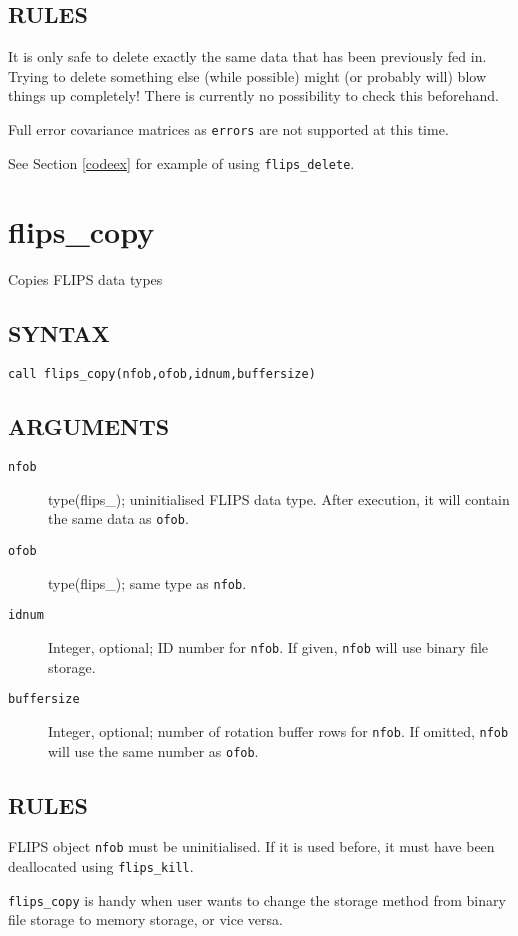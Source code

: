 \documentclass[a4paper,twoside]{refrep}
\newcommand{\code}[1]{{\tt #1}}
\newcommand{\aitem}[1]{\item[{\tt #1}]}
\newenvironment{arglist}
	{\begin{description}}
	{\end{description}}
\begin{document}
\subsection*{RULES}



\attention It is only safe to delete exactly the same data that has been previously fed in. Trying to delete something else (while possible) might (or probably will) blow things up completely! There is currently no possibility to check this beforehand.

\attention Full error covariance matrices as \code{errors} are not supported at this time.

See Section \ref{codeex} for example of using \code{flips\_delete}.


\newpage
\section{flips\_copy}
Copies FLIPS data types

\subsection*{SYNTAX}
\code{call flips\_copy(nfob,ofob,idnum,buffersize)}

\subsection*{ARGUMENTS}
\begin{arglist}
\aitem{nfob} type(flips\_<s|d|c|z>); uninitialised FLIPS data type. After execution, it will contain the same data as \code{ofob}.
\aitem{ofob} type(flips\_<s|d|c|z>); same type as \code{nfob}.
\aitem{idnum} Integer, optional; ID number for \code{nfob}. If given, \code{nfob} will use binary file storage.
\aitem{buffersize} Integer, optional; number of rotation buffer rows for \code{nfob}. If omitted, \code{nfob} will use the same number as \code{ofob}.
\end{arglist}

\subsection*{RULES}
FLIPS object \code{nfob} must be uninitialised. If it is used before, it must have been deallocated using \code{flips\_kill}.

\code{flips\_copy} is handy when user wants to change the storage method from binary file storage to memory storage,  or vice versa.
\end{document}
